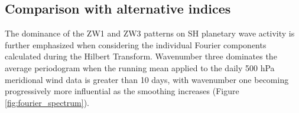 \subsection{Comparison with alternative indices}

The dominance of the ZW1 and ZW3 patterns on SH planetary wave activity is further emphasized when considering the individual Fourier components calculated during the Hilbert Transform. Wavenumber three dominates the average periodogram when the running mean applied to the daily 500 hPa meridional wind data is greater than 10 days, with wavenumber one becoming progressively more influential as the smoothing increases (Figure \ref{fig:fourier_spectrum}).